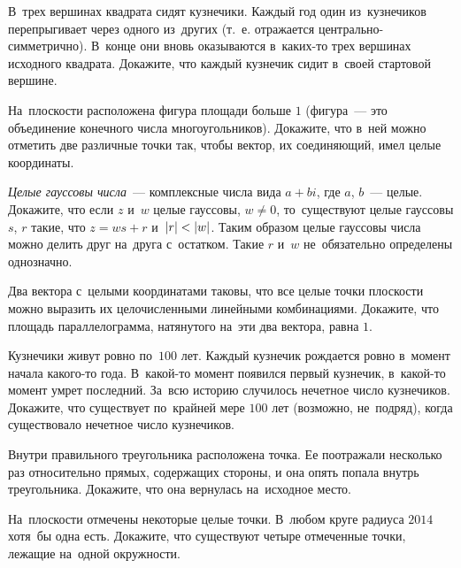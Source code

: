 \begin{problems}

\item
В~трех вершинах квадрата сидят кузнечики.
Каждый год один из~кузнечиков перепрыгивает через одного из~других
(т.~е. отражается центрально-симметрично).
В~конце они вновь оказываются в~каких-то трех вершинах исходного квадрата.
Докажите, что каждый кузнечик сидит в~своей стартовой вершине.

\item
На~плоскости расположена фигура площади больше $1$
(фигура~--- это объединение конечного числа многоугольников).
Докажите, что в~ней можно отметить две различные точки так, чтобы вектор, их
соединяющий, имел целые координаты.

\item
\emph{Целые гауссовы числа}~--- комплексные числа вида $a + bi$, где
$a$, $b$~--- целые.
Докажите, что если $z$ и~$w$ целые гауссовы, $w \neq 0$, то~существуют
целые гауссовы $s$, $r$ такие, что $z = w s + r$ и~$\lvert r \rvert < \lvert w \rvert$.
Таким образом целые гауссовы числа можно делить друг на~друга с~остатком.
Такие $r$ и~$w$ не~обязательно определены однозначно.

\item
\label{algebra/grid/main:problem:basis-volume}%
Два вектора с~целыми координатами таковы, что все целые точки плоскости можно
выразить их целочисленными линейными комбинациями.
Докажите, что площадь параллелограмма, натянутого на~эти два вектора,
равна $1$.

\item
Кузнечики живут ровно по~$100$ лет.
Каждый кузнечик рождается ровно в~момент начала какого-то года.
В~какой-то момент появился первый кузнечик, в~какой-то момент умрет последний.
За~всю историю случилось нечетное число кузнечиков.
Докажите, что существует по~крайней мере $100$ лет (возможно, не~подряд),
когда существовало нечетное число кузнечиков.

\item
Внутри правильного треугольника расположена точка.
Ее поотражали несколько раз относительно прямых, содержащих стороны,
и она опять попала внутрь треугольника.
Докажите, что она вернулась на~исходное место.

\item
На~плоскости отмечены некоторые целые точки.
В~любом круге радиуса $2014$ хотя~бы одна есть.
Докажите, что существуют четыре отмеченные точки, лежащие на~одной окружности.

\end{problems}

